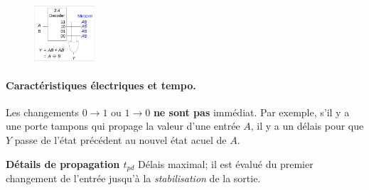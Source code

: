 \documentclass{report}
\begin{document}
\begin{multicols*}{3}
    \begin{center}
    \end{center}



    \begin{figure}[H]
      \begin{center}
        \includegraphics[width=0.20\textwidth]{ImplementationDecodeur.png}
      \end{center}
    \end{figure}

    \paragraph{Caractéristiques électriques et tempo.}
    Les changements $0 \rightarrow 1$ ou $1 \rightarrow 0$ \textbf{ne sont pas}  
    immédiat. Par exemple, s'il y a une porte tampons qui 
    propage la valeur d'une entrée $A$, il y a un délais 
    pour que $Y$ passe de l'état précédent au nouvel état acuel 
    de $A$. 

    \noindent \textbf{Détails de propagation $t_{pd}$}  
    Délais maximal; il est évalué du premier changement de l'entrée 
    jusqu'à la \textit{stabilisation} de la sortie.   



\end{multicols*}
\end{document}
